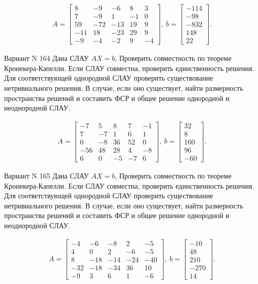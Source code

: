 \documentclass[11pt]{report}
\begin{document}
\begin{align*}
 A = \left[\begin{matrix}8 & -9 & -6 & 8 & 3\\7 & -9 & 1 & -1 & 0\\59 & -72 & -13 & 19 & 9\\-11 & 18 & -23 & 29 & 9\\-9 & -4 & -2 & 9 & -4\end{matrix}\right],
\ b = \left[\begin{matrix}-114\\-98\\-832\\148\\22\end{matrix}\right]. 
 \end{align*}

Вариант N 164
Дана СЛАУ $AX = b$,
Проверить совместность по теореме Кронекера-Капелли. Если СЛАУ совместна, проверить единственность решения.
Для соответствующей однородной СЛАУ проверить существование нетривиального решения. В случае, если оно существует,
найти размерность пространства решений и составить ФСР и общее решение однородной  и неоднородной СЛАУ.


\begin{align*}
 A = \left[\begin{matrix}-7 & 5 & 8 & 7 & -1\\7 & -7 & 1 & 6 & 1\\0 & -8 & 36 & 52 & 0\\-56 & 48 & 28 & 4 & -8\\6 & 0 & -5 & -7 & 6\end{matrix}\right],
\ b = \left[\begin{matrix}32\\8\\160\\96\\-60\end{matrix}\right]. 
 \end{align*}

Вариант N 165
Дана СЛАУ $AX = b$,
Проверить совместность по теореме Кронекера-Капелли. Если СЛАУ совместна, проверить единственность решения.
Для соответствующей однородной СЛАУ проверить существование нетривиального решения. В случае, если оно существует,
найти размерность пространства решений и составить ФСР и общее решение однородной  и неоднородной СЛАУ.


\begin{align*}
 A = \left[\begin{matrix}-4 & -6 & -8 & 2 & -5\\4 & 0 & 2 & -6 & -5\\8 & -18 & -14 & -24 & -40\\-32 & -18 & -34 & 36 & 10\\-9 & 3 & 6 & 1 & -6\end{matrix}\right],
\ b = \left[\begin{matrix}-10\\48\\210\\-270\\14\end{matrix}\right]. 
 \end{align*}
\end{document}
